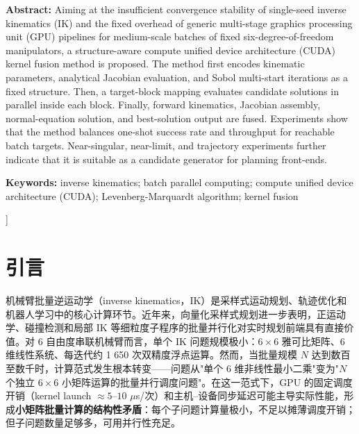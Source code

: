 \documentclass[twocolumn,a4paper,10pt]{ctexart}
\begin{document}
{\begin{minipage}{0.91\textwidth}
{\bfseries Abstract:} Aiming at the insufficient convergence stability of single-seed inverse kinematics (IK) and the fixed overhead of generic multi-stage graphics processing unit (GPU) pipelines for medium-scale batches of fixed six-degree-of-freedom manipulators, a structure-aware compute unified device architecture (CUDA) kernel fusion method is proposed. The method first encodes kinematic parameters, analytical Jacobian evaluation, and Sobol multi-start iterations as a fixed structure. Then, a target-block mapping evaluates candidate solutions in parallel inside each block. Finally, forward kinematics, Jacobian assembly, normal-equation solution, and best-solution output are fused. Experiments show that the method balances one-shot success rate and throughput for reachable batch targets. Near-singular, near-limit, and trajectory experiments further indicate that it is suitable as a candidate generator for planning front-ends.\par\vspace{2mm}
{\bfseries Keywords:} inverse kinematics; batch parallel computing; compute unified device architecture (CUDA); Levenberg-Marquardt algorithm; kernel fusion\par
\end{minipage}\par
}]

\setcounter{section}{-1}
\section{引言}

机械臂批量逆运动学（inverse kinematics，IK）是采样式运动规划、轨迹优化和机器人学习中的核心计算环节\cite{siciliano2010robotics,lynch2017modern,lavalle2006planning,sucan2012ompl}。近年来，向量化采样式规划进一步表明，正运动学、碰撞检测和局部 IK 等细粒度子程序的批量并行化对实时规划前端具有直接价值\cite{thomason2024vamp}。对 6 自由度串联机械臂而言，单个 IK 问题规模极小：$6\times6$ 雅可比矩阵、6 维线性系统、每迭代约 1 650 次双精度浮点运算。然而，当批量规模 $N$ 达到数百至数千时，计算范式发生根本转变——问题从"单个 6 维非线性最小二乘"变为"$N$ 个独立 $6\times6$ 小矩阵运算的批量并行调度问题"。在这一范式下，GPU 的固定调度开销（kernel launch $\approx5$--$10$ $\mu$s/次）和主机--设备同步延迟可能主导实际性能\cite{cuda,nickolls2008cuda}，形成\textbf{小矩阵批量计算的结构性矛盾}：每个子问题计算量极小，不足以摊薄调度开销；但子问题数量足够多，可用并行性充足。
\end{document}
